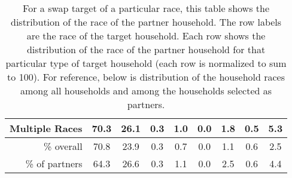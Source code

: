 \begin{table}
\begin{tabular}{|r|c|c|c|c|c|c|c|c|}
    Multiple Races & 70.3                 & 26.1                 & 0.3                      & 1.0                   & 0.0                     & 1.8                    & 0.5                   & 5.3                               \\ \hline\hline
    \% overall     & 70.8                 & 23.9                 & 0.3                      & 0.7                   & 0.0                     & 1.1                    & 0.6                   & 2.5                               \\ \hline
    \% of partners & 64.3                 & 26.6                 & 0.3                      & 1.1                   & 0.0                     & 2.5                    & 0.6                   & 4.4                               \\ \hline
    \end{tabular}
    \caption{For a swap target of a particular race, this table shows the distribution of the race of the partner household. The row labels are the race of the target household. Each row shows the distribution of the race of the partner household for that particular type of target household (each row is normalized to sum to 100). For reference, below is distribution of the household races among all households and among the households selected as partners.}
    \label{tab:partner_distribution}
\end{table}